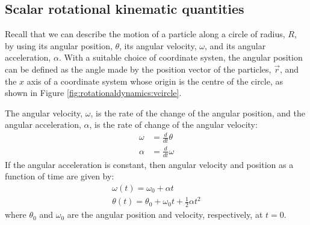 \subsection{Scalar rotational kinematic quantities}
Recall that we can describe the motion of a particle along a circle of radius, $R$, by using its angular position, $\theta$, its angular velocity, $\omega$, and its angular acceleration, $\alpha$. With a suitable choice of coordinate systen, the angular position can be defined as the angle made by the position vector of the particles, $\vec r$, and the $x$ axis of a coordinate system whose origin is the centre of the circle, as shown in Figure \ref{fig:rotationaldynamics:vcircle}. 

The angular velocity, $\omega$, is the rate of the change of the angular position, and the angular acceleration, $\alpha$, is the rate of change of the angular velocity:
\begin{align*}
\omega &= \frac{d}{dt}\theta \\
\alpha &= \frac{d}{dt}\omega
\end{align*}
If the angular acceleration is constant, then angular velocity and position as a function of time are given by:
\begin{align*}
\omega(t) = \omega_0+\alpha t\\
\theta(t) = \theta_0+\omega_0 t+\frac{1}{2}\alpha t^2
\end{align*}
where $\theta_0$ and $\omega_0$ are the angular position and velocity, respectively, at $t=0$.

